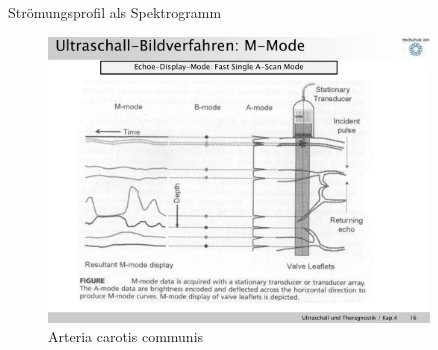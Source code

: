 \documentclass{beamer}
\begin{document}
\begin{frame}{Strömungsprofil als Spektrogramm}
\begin{figure}[h]
			\includegraphics[page=3,trim = 3mm 15mm 10mm 43mm, clip=true,width=0.9\textwidth]{vortrag/Vortrag.pdf}
			\caption{Arteria carotis communis}
		\end{figure}
\end{frame}
%
%
%
%
\end{document}
